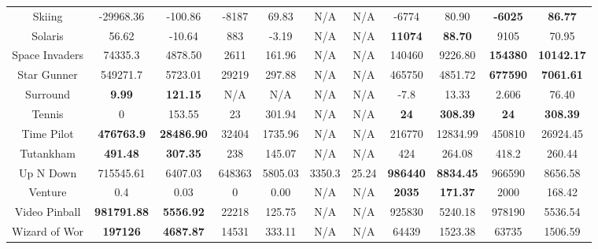\documentclass[nohyperref]{article}
\newcommand{\best}[1]{\textbf{#1}}
\theoremstyle{plain}
\begin{document}
\begin{table}[!hb]
\begin{center}
\begin{tabular}{|c |c c| c c| c c| c c| c c|}
 Skiing             & -29968.36      & -100.86     & -8187    &69.83       & N/A      & N/A     & -6774       & 80.90                       &\textbf{-6025}  &\textbf{86.77}\\
 Solaris            & 56.62                 & -10.64       & 883       &-3.19       & N/A      & N/A     & \best{11074}       & \best{88.70   }               &9105            &70.95\\
 Space Invaders     & 74335.3               & 4878.50      & 2611      &161.96      & N/A      & N/A     & 140460     & 9226.80                 &\textbf{154380}          &\textbf{10142.17}\\
 Star Gunner        & 549271.7       & 5723.01      & 29219    &297.88      & N/A      & N/A     & 465750      & 4851.72                    &\textbf{677590}          &\textbf{7061.61}\\
 Surround           & \textbf{9.99       }    & \textbf{121.15     }  & N/A       &N/A         & N/A      & N/A     & -7.8          & 13.33                   &2.606           &76.40 \\
 Tennis             & 0       & 153.55  & 23        &301.94      & N/A      & N/A     & \textbf{24}          & \textbf{308.39}                                &\textbf{24}              &\textbf{308.39}  \\
 Time Pilot         & \textbf{476763.9}       & \textbf{28486.90}     & 32404    &1735.96     & N/A      & N/A     & 216770      & 12834.99                   &450810	          &26924.45 \\
 Tutankham          & \textbf{491.48     }    & \textbf{307.35     }  & 238       &145.07      & N/A      & N/A     & 424         & 264.08                    &418.2           &260.44 \\
 Up N Down          & 715545.61             & 6407.03      & 648363   &5805.03     & 3350.3   & 25.24   & \best{986440}      & \best{8834.45}                 &966590          &8656.58\\
 Venture            & 0.4                   & 0.03         & 0         &0.00        & N/A      & N/A     & \best{2035}        & \best{171.37 }                &2000	            &168.42\\
 Video Pinball      & \textbf{981791.88}      & \textbf{5556.92}      & 22218    &125.75      & N/A      & N/A     & 925830      & 5240.18                    &978190          &5536.54\\
 Wizard of Wor      & \textbf{197126         }& \textbf{4687.87}      & 14531    &333.11      & N/A      & N/A     & 64439       & 1523.38                    &63735           &1506.59\\

\end{tabular}
\end{center}
\end{table}
\end{document}
